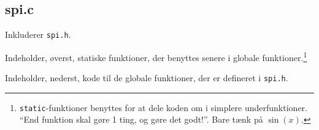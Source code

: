 \documentclass[article, 10pt]{memoir}
\let\tempone\itemize
\let\temptwo\enditemize
\renewenvironment{itemize}{\tempone\firmlist}{\temptwo}
\begin{document}
\begin{multicols}{2}
    \section{spi.c}
    \begin{itemize}
    \item Inkluderer \texttt{spi.h}.
    \item Indeholder, øverst, statiske funktioner, der benyttes senere i globale funktioner.\footnote{\texttt{static}-funktioner benyttes for at dele koden om i simplere underfunktioner. ``End funktion skal gøre 1 ting, og gøre det godt!''. Bare tænk på $\sin(x)$.}
    \item Indeholder, nederst, kode til de globale funktioner, der er defineret i \texttt{spi.h}.
    \end{itemize}
\end{multicols}
\end{document}
